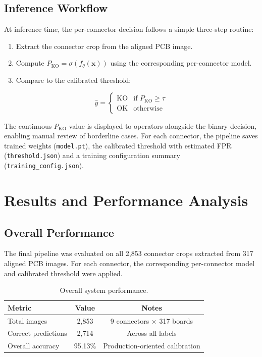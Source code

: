 \documentclass[11pt,a4paper,draft]{article}
\begin{document}
\subsection{Inference Workflow}

At inference time, the per-connector decision follows a simple three-step routine:

\begin{enumerate}[nosep]
    \item Extract the connector crop from the aligned PCB image.
    \item Compute $P_{\mathrm{KO}} = \sigma(f_\theta(\mathbf{x}))$ using the corresponding per-connector model.
    \item Compare to the calibrated threshold:
\end{enumerate}
\begin{equation}
    \hat{y} =
    \begin{cases}
    \mathrm{KO} & \text{if } P_{\mathrm{KO}} \geq \tau \\
    \mathrm{OK} & \text{otherwise}
    \end{cases}
\end{equation}

The continuous $P_{\mathrm{KO}}$ value is displayed to operators alongside the binary decision, enabling manual review of borderline cases. For each connector, the pipeline saves trained weights (\texttt{model.pt}), the calibrated threshold with estimated FPR (\texttt{threshold.json}) and a training configuration summary (\texttt{training\_config.json}).


\section{Results and Performance Analysis}

\subsection{Overall Performance}

The final pipeline was evaluated on all 2{,}853 connector crops extracted from 317 aligned PCB images. For each connector, the corresponding per-connector model and calibrated threshold were applied.

\begin{table}[H]
\centering
\begin{tabular}{lcc}
\toprule
Metric & Value & Notes \\
\midrule
Total images & 2{,}853 & 9 connectors $\times$ 317 boards \\
Correct predictions & 2{,}714 & Across all labels \\
Overall accuracy & 95.13\% & Production-oriented calibration \\
\bottomrule
\end{tabular}
\caption{Overall system performance.}
\label{tab:overall}
\end{table}
\end{document}
